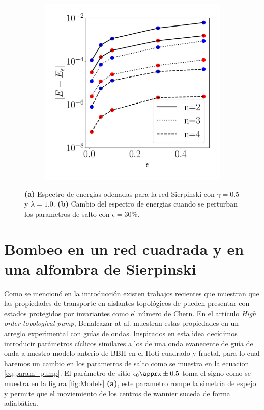 \begin{figure}[h!]
\begin{subfigure}[b!]{0.33 \textwidth}
    \end{subfigure}
    \begin{subfigure}[b!]{0.33 \textwidth}
        \caption{}
        \includegraphics[width=\textwidth]{Imagenes/Resultados_Hoti_Fractal/pertubation_gen_fractal.pdf}
    \end{subfigure}\hspace*{-0.9em}

       \caption{\textbf{(a)} Espectro de energias odenadas para la red Sierpinski con $\gamma = 0.5$ y $\lambda = 1.0$. \textbf{(b)} Cambio del espectro de energias cuando se perturban los parametros de salto con $\epsilon = 30\%$.}
       \label{fig:spectre_fractal_epsi}
\end{figure}

\section{Bombeo en un red cuadrada y en una alfombra de Sierpinski}

Como se mencionó en la introducción existen trabajos recientes que muestran que las propiedades de transporte en aislantes topológicos de pueden presentar con estados protegidos por invariantes como el número de Chern. En el artículo \textit{High order topological pump}\cite{benalcazar2020higher}, Benalcazar at al. muestran estas propiedades en un arreglo experimental con guías de ondas. Inspirados en esta idea decidimos introducir parámetros cíclicos similares a los de una onda evanecente de guía de onda a nuestro modelo anterio de BBH en el Hoti cuadrado y fractal, para lo cual haremos un cambio en los parametros de salto como se muestra en la ecuacion \ref{eq:param_pump}. El parámetro de sitio $\epsilon_0 \apprx \pm 0.5$ toma el signo como se muestra en la figura \ref{fig:Models} \textbf{(a)}, este parametro rompe la simetría de espejo y permite que el moviemiento de los centros de wannier suceda de forma adiabática.


